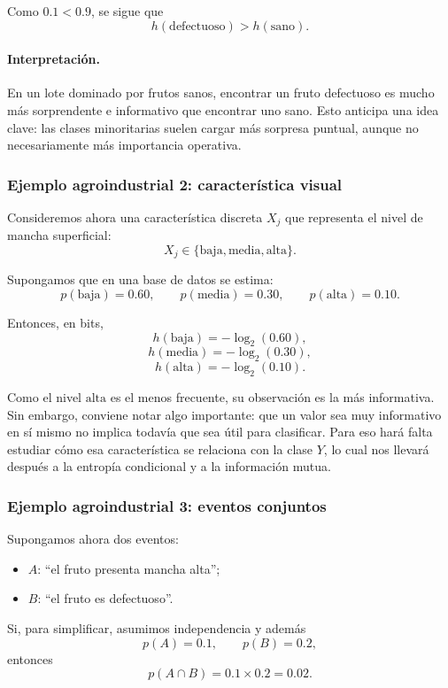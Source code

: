 \documentclass{article}
\begin{document}
Como \(0.1<0.9\), se sigue que
\[
h(\text{defectuoso})>h(\text{sano}).
\]

\paragraph{Interpretación.}
En un lote dominado por frutos sanos, encontrar un fruto defectuoso es mucho más sorprendente e informativo que encontrar uno sano. Esto anticipa una idea clave: las clases minoritarias suelen cargar más sorpresa puntual, aunque no necesariamente más importancia operativa.

\subsubsection*{Ejemplo agroindustrial 2: característica visual}

Consideremos ahora una característica discreta \(X_j\) que representa el nivel de mancha superficial:
\[
X_j \in \{\text{baja},\text{media},\text{alta}\}.
\]

Supongamos que en una base de datos se estima:
\[
p(\text{baja})=0.60,\qquad p(\text{media})=0.30,\qquad p(\text{alta})=0.10.
\]

Entonces, en bits,
\[
h(\text{baja})=-\log_2(0.60),
\]
\[
h(\text{media})=-\log_2(0.30),
\]
\[
h(\text{alta})=-\log_2(0.10).
\]

Como el nivel \(\text{alta}\) es el menos frecuente, su observación es la más informativa. Sin embargo, conviene notar algo importante: que un valor sea muy informativo en sí mismo no implica todavía que sea útil para clasificar. Para eso hará falta estudiar cómo esa característica se relaciona con la clase \(Y\), lo cual nos llevará después a la entropía condicional y a la información mutua.

\subsubsection*{Ejemplo agroindustrial 3: eventos conjuntos}

Supongamos ahora dos eventos:

\begin{itemize}
\item \(A\): ``el fruto presenta mancha alta'';
\item \(B\): ``el fruto es defectuoso''.
\end{itemize}

Si, para simplificar, asumimos independencia y además
\[
p(A)=0.1, \qquad p(B)=0.2,
\]
entonces
\[
p(A\cap B)=0.1\times 0.2 = 0.02.
\]
\end{document}
